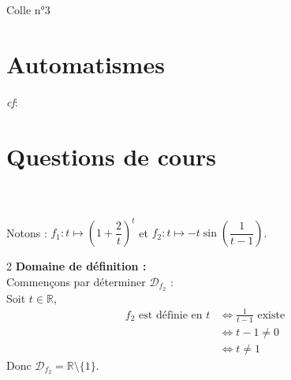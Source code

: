 \documentclass{article}
\begin{document}
\pagestyle{fancy}
\fancyhf{}
{\selectfont
\begin{center}
\Huge{Colle n°3} %
\end{center}
\section{Automatismes}
\noindent \textit{cf}: \href{https://1drv.ms/b/c/7e66df76a526ba79/IQBagJNN3ihvT7w402za7VA-AcGb2SWqQ4ZRgtFisU0i2aU?e=mMaqkx}{}
\section{Questions de cours}
\\
\\
Notons : $f_1:t\mapsto\left(1+\dfrac{2}{t}\right)^t$ et $f_2:t\mapsto-t\sin \left(\dfrac1{t-1}\right)$.\\

\begin{multicols}{2}
\noindent \textbf{Domaine de définition :}\\
Commençons par déterminer $\mathcal{D}_{f_2}$ :\\
Soit $t\in\mathbb{R}$,
\begin{align*}
f_2 \text{ est définie en } t &\Leftrightarrow \frac{1}{t-1} \text{ existe}\\
&\Leftrightarrow t-1\neq 0\\
&\Leftrightarrow t\neq 1
\end{align*}
Donc $\mathcal{D}_{f_2}=\mathbb{R}\setminus\{1\}$.

\columnbreak


\end{multicols}}
\end{document}
